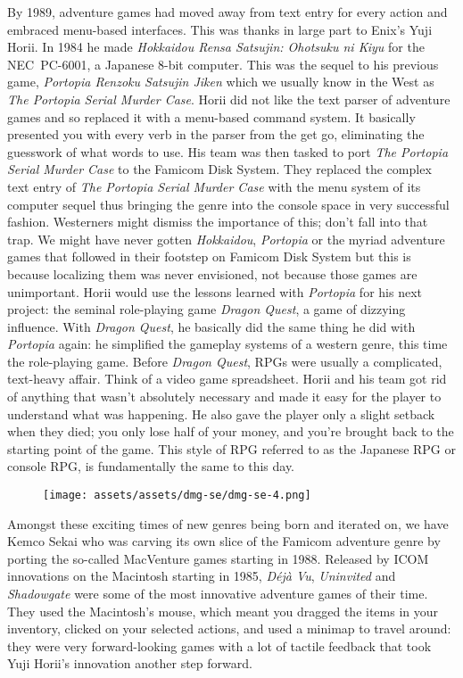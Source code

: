 \documentclass{book}
\begin{document}
By 1989, adventure games had moved away from text entry for every action and embraced menu-based interfaces. This was thanks in large part to Enix’s Yuji Horii. In 1984 he made \emph{Hokkaidou Rensa Satsujin: Ohotsuku ni Kiyu} for the NEC PC-6001, a Japanese 8-bit computer. This was the sequel to his previous game, \emph{Portopia Renzoku Satsujin Jiken} which we usually know in the West as \emph{The Portopia Serial Murder Case}. Horii did not like the text parser of adventure games and so replaced it with a menu-based command system. It basically presented you with every verb in the parser from the get go, eliminating the guesswork of what words to use. His team was then tasked to port \emph{The Portopia Serial Murder Case} to the Famicom Disk System. They replaced the complex text entry of \emph{The Portopia Serial Murder Case} with the menu system of its computer sequel thus bringing the genre into the console space in very successful fashion. Westerners might dismiss the importance of this; don’t fall into that trap. We might have never gotten \emph{Hokkaidou}, \emph{Portopia} or the myriad adventure games that followed in their footstep on Famicom Disk System but this is because localizing them was never envisioned, not because those games are unimportant. Horii would use the lessons learned with \emph{Portopia} for his next project: the seminal role-playing game \emph{Dragon Quest}, a game of dizzying influence. With \emph{Dragon Quest}, he basically did the same thing he did with \emph{Portopia} again: he simplified the gameplay systems of a western genre, this time the role-playing game. Before \emph{Dragon Quest}, RPGs were usually a complicated, text-heavy affair. Think of a video game spreadsheet. Horii and his team got rid of anything that wasn’t absolutely necessary and made it easy for the player to understand what was happening. He also gave the player only a slight setback when they died; you only lose half of your money, and you’re brought back to the starting point of the game. This style of RPG referred to as the Japanese RPG or console RPG, is fundamentally the same to this day.

\begin{figure}[hbt]
\vskip 10pt
\centering \texttt{[image: assets/assets/dmg-se/dmg-se-4.png]}
\vskip 6pt
\end{figure}
Amongst these exciting times of new genres being born and iterated on, we have Kemco Sekai who was carving its own slice of the Famicom adventure genre by porting the so-called MacVenture games starting in 1988. Released by ICOM innovations on the Macintosh starting in 1985, \emph{Déjà Vu}, \emph{Uninvited} and \emph{Shadowgate} were some of the most innovative adventure games of their time. They used the Macintosh’s mouse, which meant you dragged the items in your inventory, clicked on your selected actions, and used a minimap to travel around: they were very forward-looking games with a lot of tactile feedback that took Yuji Horii’s innovation another step forward.
\end{document}
